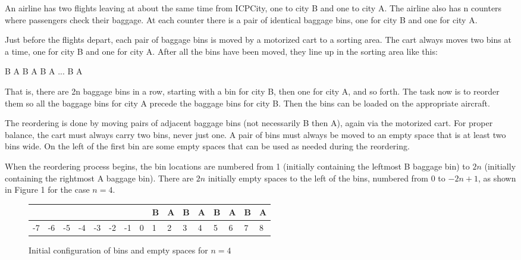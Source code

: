 
An airline has two flights leaving at about the same time from ICPCity, one to city B and one to city A.
The airline also has n counters where passengers check their baggage. At each counter there is a pair of
identical baggage bins, one for city B and one for city A.


Just before the flights depart, each pair of baggage bins is moved by a motorized cart to a sorting area.
The cart always moves two bins at a time, one for city B and one for city A. After all the bins have been
moved, they line up in the sorting area like this:


\begin{center}
	B A B A B A ... B A
\end{center}

That is, there are 2n baggage bins in a row, starting with a bin for city B, then one for city A, and so
forth. The task now is to reorder them so all the baggage bins for city A precede the baggage bins for
city B. Then the bins can be loaded on the appropriate aircraft.


The reordering is done by moving pairs of adjacent baggage bins (not necessarily B then A), again via
the motorized cart. For proper balance, the cart must always carry two bins, never just one. A pair of
bins must always be moved to an empty space that is at least two bins wide. On the left of the first bin
are some empty spaces that can be used as needed during the reordering.


When the reordering process begins, the bin locations are numbered from 1 (initially containing the leftmost B baggage bin) to $2n$ (initially containing the rightmost A baggage bin). There are $2n$ initially empty spaces to the left of the bins, numbered from 0 to $-2n+1$, as shown in Figure 1 for the case $n=4$.

\begin{figure}[h!]
	\centering
\begin{tabular}{llllllllllllllll}
	\hline
	\multicolumn{1}{|l|}{} & \multicolumn{1}{l|}{} & \multicolumn{1}{l|}{} & \multicolumn{1}{l|}{} & \multicolumn{1}{l|}{} & \multicolumn{1}{l|}{} & \multicolumn{1}{l|}{} & \multicolumn{1}{l|}{} & \multicolumn{1}{l|}{B} & \multicolumn{1}{l|}{A} & \multicolumn{1}{l|}{B} & \multicolumn{1}{l|}{A} & \multicolumn{1}{l|}{B} & \multicolumn{1}{l|}{A} & \multicolumn{1}{l|}{B} & \multicolumn{1}{l|}{A} \\ \hline
	-7                     & -6                    & -5                    & -4                    & -3                    & -2                    & -1                    & 0                     & 1                      & 2                      & 3                      & 4                      & 5                      & 6                      & 7                      & 8                     
\end{tabular}
	\caption{Initial configuration of bins and empty spaces for $n=4$}
\end{figure}

